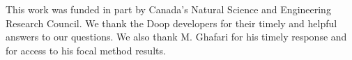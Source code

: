 \documentclass[sigconf,review,anonymous]{acmart}
\begin{document}














\begin{acks} 
This work was funded in part by Canada's Natural Science and Engineering Research Council.
We thank the Doop developers for their timely and helpful answers to our questions. %
We also thank M. Ghafari for his timely response and for access to his focal method results. 
\end{acks}



\end{document}
